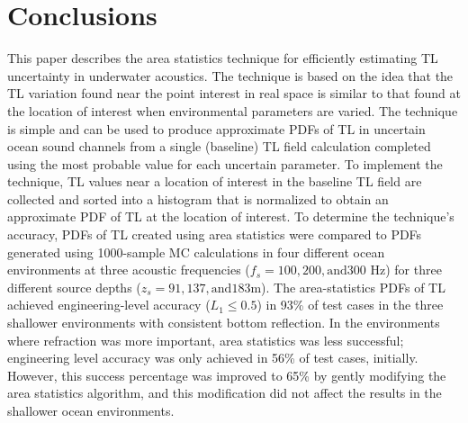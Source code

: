 \section{Conclusions} \label{section:asuq_astats_conclusions} This
paper describes the area statistics technique for efficiently
estimating \ac{TL} uncertainty in underwater acoustics. The technique
is based on the idea that the \ac{TL} variation found near the point
interest in real space is similar to that found at the location of
interest when environmental parameters are varied. The technique is
simple and can be used to produce approximate \acp{PDF} of \ac{TL} in uncertain
ocean sound channels from a single (baseline) \ac{TL} field calculation
completed using the most probable value for each uncertain
parameter. To implement the technique, \ac{TL} values near a location of
interest in the baseline \ac{TL} field are collected and sorted into a
histogram that is normalized to obtain an approximate \ac{PDF} of \ac{TL} at the
location of interest. To determine the technique's accuracy, \acp{PDF} of
\ac{TL} created using area statistics were compared to \acp{PDF} generated using
1000-sample \ac{MC} calculations in four different ocean
environments at three acoustic frequencies ($f_s=100, 200, \text{and} 300$ Hz) for
three different source depths ($z_s=91, 137, \text{and} 183$m). The area-statistics
\acp{PDF} of \ac{TL} achieved engineering-level accuracy ($L_1\leq0.5$) in 93\% of
test cases in the three shallower environments with consistent bottom
reflection. In the environments where refraction was more important,
area statistics was less successful; engineering level accuracy was
only achieved in 56\% of test cases, initially.  However, this success
percentage was improved to 65\% by gently modifying the area
statistics algorithm, and this modification did not affect the results
in the shallower ocean environments.

